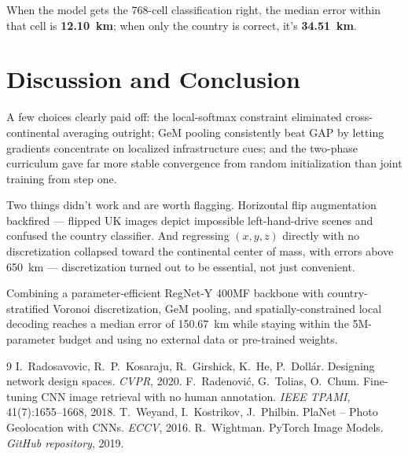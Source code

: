 \documentclass[10pt,twocolumn,a4paper]{article}
\begin{document}
\begin{table}[h]
\centering
\small
\caption{Ablations on the validation split (60 epochs)}
\label{tab:ablations}
\end{table}

When the model gets the 768-cell classification right, the median error within that cell is \textbf{12.10~km}; when only the country is correct, it's \textbf{34.51~km}.

\section{Discussion and Conclusion}
A few choices clearly paid off: the local-softmax constraint eliminated cross-continental averaging outright; GeM pooling consistently beat GAP by letting gradients concentrate on localized infrastructure cues; and the two-phase curriculum gave far more stable convergence from random initialization than joint training from step one.

Two things didn't work and are worth flagging. Horizontal flip augmentation backfired — flipped UK images depict impossible left-hand-drive scenes and confused the country classifier. And regressing $(x,y,z)$ directly with no discretization collapsed toward the continental center of mass, with errors above 650~km — discretization turned out to be essential, not just convenient.

Combining a parameter-efficient RegNet-Y 400MF backbone with country-stratified Voronoi discretization, GeM pooling, and spatially-constrained local decoding reaches a median error of 150.67~km while staying within the 5M-parameter budget and using no external data or pre-trained weights.

\begin{thebibliography}{9}
\small
{} I.~Radosavovic, R.~P.~Kosaraju, R.~Girshick, K.~He, P.~Doll{\'a}r. Designing network design spaces. \emph{CVPR}, 2020.
 F.~Radenovi{\'c}, G.~Tolias, O.~Chum. Fine-tuning CNN image retrieval with no human annotation. \emph{IEEE TPAMI}, 41(7):1655--1668, 2018.
 T.~Weyand, I.~Kostrikov, J.~Philbin. PlaNet -- Photo Geolocation with CNNs. \emph{ECCV}, 2016.
 R.~Wightman. PyTorch Image Models. \emph{GitHub repository}, 2019.
\end{thebibliography}
\end{document}
